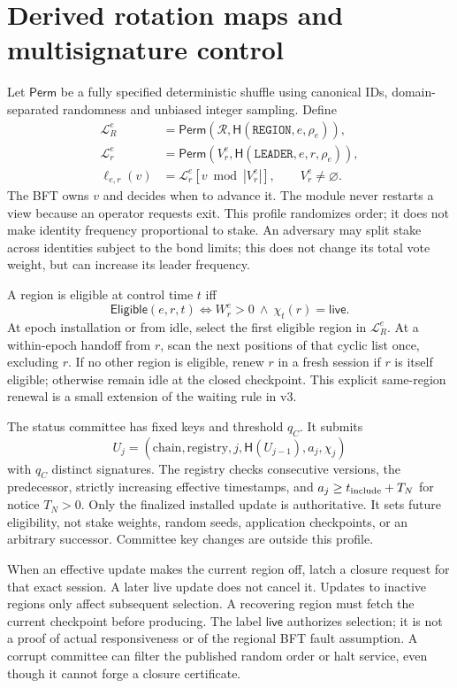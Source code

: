 \documentclass[11pt,a4paper]{article}
\newcommand{\Tag}[1]{\ensuremath{\mathsf{#1}}}
\newcommand{\Proc}[1]{\mathsf{#1}}
\newcommand{\Hash}{\mathsf H}
\begin{document}
\section{Derived rotation maps and multisignature control}
\label{sec:maps}

Let $\Proc{Perm}$ be a fully specified deterministic shuffle using canonical
IDs, domain-separated randomness and unbiased integer sampling. Define
\[
\begin{aligned}
\mathcal L_R^e&=\Proc{Perm}(\mathcal R,
 \Hash(\texttt{REGION},e,\rho_e)),\\
\mathcal L_r^e&=\Proc{Perm}(V_r^e,
 \Hash(\texttt{LEADER},e,r,\rho_e)),\\
\ell_{e,r}(v)&=\mathcal L_r^e[v\bmod |V_r^e|],\qquad V_r^e\ne\varnothing.
\end{aligned}
\]
The BFT owns $v$ and decides when to advance it. The module never restarts
a view because an operator requests exit. This profile randomizes order;
it does not make identity frequency proportional to stake. An adversary
may split stake across identities subject to the bond limits; this does
not change its total vote weight, but can increase its leader frequency.

A region is eligible at control time $t$ iff
\[
\Proc{Eligible}(e,r,t)\iff W_r^e>0\ \land\ \chi_t(r)=\Tag{live}.
\]
At epoch installation or from idle, select the first eligible region in
$\mathcal L_R^e$. At a within-epoch handoff from $r$, scan the next positions
of that cyclic list once, excluding $r$. If no other region is eligible,
renew $r$ in a fresh session if $r$ is itself eligible; otherwise remain
idle at the closed checkpoint. This explicit same-region renewal is a
small extension of the waiting rule in v3.

The status committee has fixed keys and threshold $q_C$. It submits
\[
U_j=(\text{chain},\text{registry},j,\Hash(U_{j-1}),a_j,\chi_j)
\]
with $q_C$ distinct signatures. The registry checks consecutive versions,
the predecessor, strictly increasing effective timestamps, and
$a_j\ge t_{\rm include}+T_N$ for notice $T_N>0$.
Only the finalized installed update is authoritative. It sets future
eligibility, not stake weights, random seeds, application checkpoints, or
an arbitrary successor. Committee key changes are outside this profile.

When an effective update makes the current region off, latch a closure
request for that exact session. A later live update does not cancel it.
Updates to inactive regions only affect subsequent selection. A recovering
region must fetch the current checkpoint before producing. The label
\Tag{live} authorizes selection; it is not a proof of actual responsiveness
or of the regional BFT fault assumption. A corrupt committee can filter
the published random order or halt service, even though it cannot forge
a closure certificate.
\end{document}
